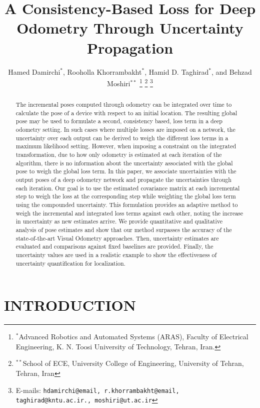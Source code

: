 \documentclass[letterpaper, 10 pt]{ieeeconf}  %
\title{\LARGE \bf
A Consistency-Based Loss for Deep Odometry Through Uncertainty Propagation
}
\author{Hamed Damirchi$^*$, Rooholla Khorrambakht$^*$, Hamid D. Taghirad$^*$, and Behzad Moshiri$^{**}$ %
\thanks{$^*$Advanced Robotics and Automated Systems (ARAS),
Faculty of Electrical Engineering, K. N. Toosi University of
Technology, Tehran, Iran.}
\thanks{$^{**}$School of ECE, University College of Engineering, University of Tehran, Tehran, Iran}
\thanks{E-mails: {\tt\small hdamirchi@email, r.khorrambakht@email, taghirad@kntu.ac.ir., moshiri@ut.ac.ir}}%
}
\begin{document}
\maketitle
\thispagestyle{empty}
\pagestyle{empty}


\begin{abstract}

The incremental poses computed through odometry can be integrated over time to calculate the pose of a device with respect to an initial location. The resulting global pose may be used to formulate a second, consistency based, loss term in a deep odometry setting. In such cases where multiple losses are imposed on a network, the uncertainty over each output can be derived to weigh the different loss terms in a maximum likelihood setting. However, when imposing a constraint on the integrated transformation, due to how only odometry is estimated at each iteration of the algorithm, there is no information about the uncertainty associated with the global pose to weigh the global loss term. In this paper, we associate uncertainties with the output poses of a deep odometry network and propagate the uncertainties through each iteration. Our goal is to use the estimated covariance matrix at each incremental step to weigh the loss at the corresponding step while weighting the global loss term using the compounded uncertainty. This formulation provides an adaptive method to weigh the incremental and integrated loss terms against each other, noting the increase in uncertainty as new estimates arrive. We provide quantitative and qualitative analysis of pose estimates and show that our method surpasses the accuracy of the state-of-the-art Visual Odometry approaches. Then, uncertainty estimates are evaluated and comparisons against fixed baselines are provided. Finally, the uncertainty values are used in a realistic example to show the effectiveness of uncertainty quantification for localization.

\end{abstract}


\section{INTRODUCTION}
\end{document}
